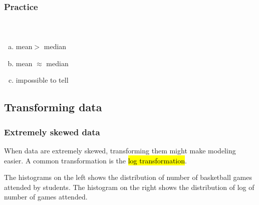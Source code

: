 \documentclass[slidestop,compress,mathserif]{beamer}
\newcommand{\soln}[1]{\textit{#1}}
\begin{document}

\begin{frame}
\frametitle{Practice}


\vspace{-0.5cm}

\begin{columns}
\begin{center}
\end{center}
$\:$ \\
$\:$ \\
\soln{}
\end{columns}

{\small
\begin{multicols}{2}
\begin{enumerate}[(a)]
\item mean$>$ median
\item mean $\approx$ median
\item impossible to tell
\end{enumerate}
\end{multicols}
}

\end{frame}


\subsection{Transforming data}


\begin{frame}
\frametitle{Extremely skewed data}

When data are extremely skewed, transforming them might make modeling easier. A common transformation is the \hl{log transformation}.

$\:$ \\
\pause
The histograms on the left shows the distribution of number of basketball games attended by students. The histogram on the right shows the distribution of log of number of games attended.

\begin{center}
\end{center}

\end{frame}
\end{document}

